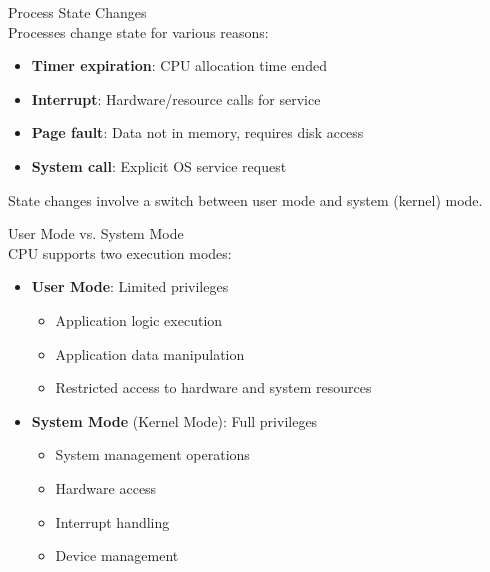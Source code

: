 \begin{definition}{Process State Changes}\\
    Processes change state for various reasons:
    \begin{itemize}
        \item \textbf{Timer expiration}: CPU allocation time ended
        \item \textbf{Interrupt}: Hardware/resource calls for service
        \item \textbf{Page fault}: Data not in memory, requires disk access
        \item \textbf{System call}: Explicit OS service request
    \end{itemize}
    
    State changes involve a switch between user mode and system (kernel) mode.
\end{definition}

\begin{definition}{User Mode vs. System Mode}\\
    CPU supports two execution modes:
    \begin{itemize}
        \item \textbf{User Mode}: Limited privileges
            \begin{itemize}
                \item Application logic execution
                \item Application data manipulation
                \item Restricted access to hardware and system resources
            \end{itemize}
        \item \textbf{System Mode} (Kernel Mode): Full privileges
            \begin{itemize}
                \item System management operations
                \item Hardware access
                \item Interrupt handling
                \item Device management
            \end{itemize}
    \end{itemize}
\end{definition}

